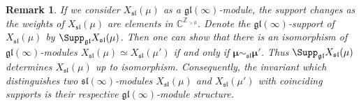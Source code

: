 \documentclass[12pt]{amsart}
\newcommand{\C}{{\mathbb C}}
\newcommand{\Z}{{\mathbb Z}}
\def\Z{\mathbb{Z}}
\newtheorem{rmk}[thm]{Remark}
\begin{document}
\begin{rmk} If we consider $X_{\mathfrak{sl}} (\mu)$ as a $\mathfrak{gl} (\infty)$-module, the support  changes as the weights of  $X_{\mathfrak{sl}} (\mu)$  are elements in $\C^{\Z_{>0}}$. Denote the $\mathfrak{gl}(\infty)$-support of  $X_{\mathfrak{sl}} (\mu)$  by $\Supp_{\mathfrak{gl}}X_{\mathfrak{sl}} (\mu)$. Then one can show that there is an isomorphism of $\mathfrak{gl} (\infty)$-modules $X_{\mathfrak{sl}} (\mu) \simeq X_{\mathfrak{sl}} (\mu')$  if and only if $\boldsymbol{\mu} \sim_{\mathfrak{sl}} \boldsymbol{\mu'}$. Thus $\Supp_{\mathfrak{gl}}X_{\mathfrak{sl}} (\mu)$ determines $X_{\mathfrak{sl}} (\mu)$  up to isomorphism. Consequently, the invariant which distinguishes two $\mathfrak{sl} (\infty)$-modules $X_{\mathfrak{sl}} (\mu)$ and $X_{\mathfrak{sl}} (\mu')$ with coinciding supports is their  respective $\mathfrak{gl} (\infty)$-module structure.
\end{rmk}
\end{document}
